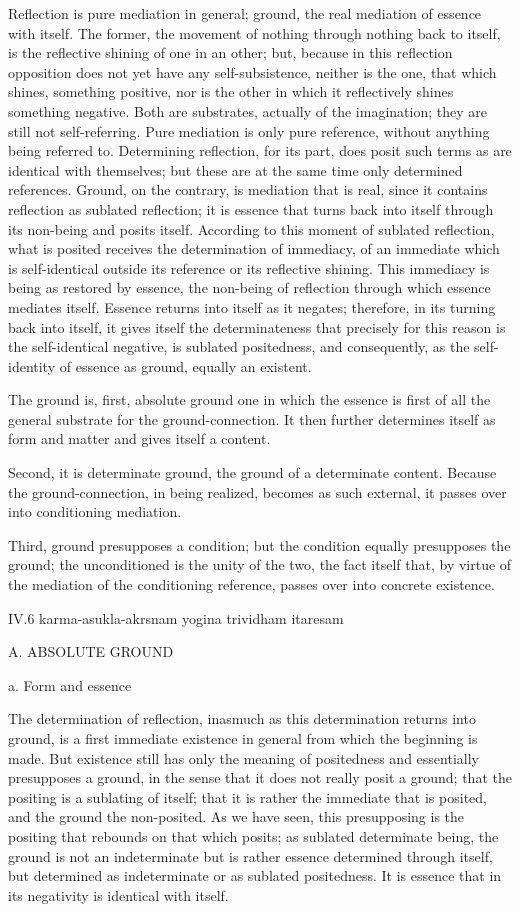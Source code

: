 Reflection is pure mediation in general;
ground, the real mediation of essence with itself.
The former, the movement of nothing through nothing back to itself,
is the reflective shining of one in an other;
but, because in this reflection opposition does not
yet have any self-subsistence,
neither is the one, that which shines, something positive,
nor is the other in which it reflectively shines something negative.
Both are substrates, actually of the imagination;
they are still not self-referring.
Pure mediation is only pure reference,
without anything being referred to.
Determining reflection, for its part, does posit
such terms as are identical with themselves;
but these are at the same time only determined references.
Ground, on the contrary, is mediation that is real,
since it contains reflection as sublated reflection;
it is essence that turns back into itself
through its non-being and posits itself.
According to this moment of sublated reflection,
what is posited receives the determination of immediacy,
of an immediate which is self-identical
outside its reference or its reflective shining.
This immediacy is being as restored by essence,
the non-being of reflection through which essence mediates itself.
Essence returns into itself as it negates;
therefore, in its turning back into itself,
it gives itself the determinateness that precisely
for this reason is the self-identical negative,
is sublated positedness, and consequently,
as the self-identity of essence as ground,
equally an existent.

The ground is, first, absolute ground
one in which the essence is first of all
the general substrate for the ground-connection.
It then further determines itself as form and matter
and gives itself a content.

Second, it is determinate ground,
the ground of a determinate content.
Because the ground-connection, in being realized,
becomes as such external,
it passes over into conditioning mediation.

Third, ground presupposes a condition;
but the condition equally presupposes the ground;
the unconditioned is the unity of the two,
the fact itself that, by virtue of
the mediation of the conditioning reference,
passes over into concrete existence.

IV.6
karma-asukla-akrsnam yogina trividham itaresam

A. ABSOLUTE GROUND

a. Form and essence

The determination of reflection,
inasmuch as this determination returns into ground,
is a first immediate existence in general
from which the beginning is made.
But existence still has only the meaning of positedness
and essentially presupposes a ground,
in the sense that it does not really posit a ground;
that the positing is a sublating of itself;
that it is rather the immediate that is posited,
and the ground the non-posited.
As we have seen, this presupposing is the positing
that rebounds on that which posits;
as sublated determinate being, the ground is not an indeterminate
but is rather essence determined through itself,
but determined as indeterminate or as sublated positedness.
It is essence that in its negativity is identical with itself.


